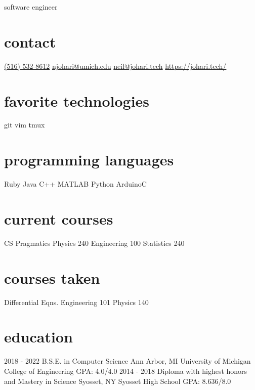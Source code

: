 \documentclass[]{friggeri-cv}
\begin{document}
{\faDesktop\hspace{.2cm} software engineer}


\begin{aside}
  \section{contact}
    \href{tel:+15165328612}{(516) 532-8612}
    \href{mailto:njohari@umich.edu}{njohari@umich.edu}
    \href{mailto:neil@johari.tech}{neil@johari.tech}
    \href{https://johari.tech/}{https://johari.tech/}
  \section{favorite technologies}
    git
    vim
    tmux
  \section{programming languages}
    Ruby
    Java 
    C++
    MATLAB
    Python
    ArduinoC
  \section{current courses}
    CS Pragmatics
    Physics 240
    Engineering 100
    Statistics 240
  \section{courses taken}
    Differential Eqns.
    Engineering 101
    Physics 140
\end{aside}

\section{education}

\begin{entrylist}
  \educationentry
    {2018 - 2022}
    {B.S.E. {\normalfont in Computer Science}}
    {Ann Arbor, MI}
    {University of Michigan College of Engineering}
    {GPA: 4.0/4.0}
  \educationentry
    {2014 - 2018}
    {Diploma {\normalfont with highest honors and Mastery in Science}}
    {Syosset, NY}
    {Syosset High School}
    {GPA: 8.636/8.0}
  
\end{entrylist}
\end{document}
